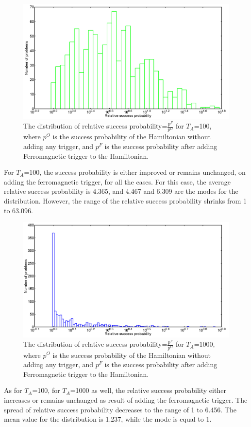 \documentclass[12]{article}
\begin{document}
\begin{figure}[H]
\centering 
\includegraphics[scale=0.3]{Hist_s12_T100_g1.png}
\caption{The distribution of relative success probability=$\frac{p^F}{p^O}$ for $T_A$=100, where $p^O$ is the success probability of the Hamiltonian without adding any trigger, and $p^F$ is the success probability after adding Ferromagnetic trigger to the Hamiltonian.}
\label{fig:f5}
\end{figure}
For $T_A$=100, the success probability is either improved or remains unchanged, on adding the ferromagnetic trigger, for all the cases. For this case, the average relative success probability is 4.365, and 4.467 and 6.309 are the modes for the distribution. However, the range of the relative success probability shrinks from 1 to 63.096.
\begin{figure}[H]
\centering 
\includegraphics[scale=0.3]{Hist_s12_T1000_g1.png}
\caption{The distribution of relative success probability=$\frac{p^F}{p^O}$ for $T_A$=1000, where $p^O$ is the success probability of the Hamiltonian without adding any trigger, and $p^F$ is the success probability after adding Ferromagnetic trigger to the Hamiltonian.}
\label{fig:f6}
\end{figure}
As for $T_A$=100, for $T_A$=1000 as well, the relative success probability either increases or remains unchanged as result of adding the ferromagnetic trigger. The spread of relative success probability decreases to the range of 1 to 6.456. The mean value for the distribution is 1.237, while the mode is equal to 1. \\
\end{document}
